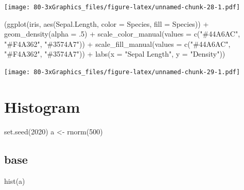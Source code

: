 \documentclass[
]{book}
\newenvironment{Shaded}{\begin{snugshade}}{\end{snugshade}}
\newcommand{\AttributeTok}[1]{\textcolor[rgb]{0.77,0.63,0.00}{#1}}
\newcommand{\DecValTok}[1]{\textcolor[rgb]{0.00,0.00,0.81}{#1}}
\newcommand{\FunctionTok}[1]{\textcolor[rgb]{0.00,0.00,0.00}{#1}}
\newcommand{\NormalTok}[1]{#1}
\newcommand{\OtherTok}[1]{\textcolor[rgb]{0.56,0.35,0.01}{#1}}
\newcommand{\SpecialCharTok}[1]{\textcolor[rgb]{0.00,0.00,0.00}{#1}}
\newcommand{\StringTok}[1]{\textcolor[rgb]{0.31,0.60,0.02}{#1}}
\begin{document}
\texttt{[image: 80-3xGraphics\_files/figure-latex/unnamed-chunk-28-1.pdf]}

\begin{Shaded}
\begin{Highlighting}[]
\NormalTok{(}\FunctionTok{ggplot}\NormalTok{(iris, }\FunctionTok{aes}\NormalTok{(Sepal.Length, }\AttributeTok{color =}\NormalTok{ Species, }\AttributeTok{fill =}\NormalTok{ Species)) }\SpecialCharTok{+} 
  \FunctionTok{geom\_density}\NormalTok{(}\AttributeTok{alpha =}\NormalTok{ .}\DecValTok{5}\NormalTok{) }\SpecialCharTok{+}
  \FunctionTok{scale\_color\_manual}\NormalTok{(}\AttributeTok{values =} \FunctionTok{c}\NormalTok{(}\StringTok{"\#44A6AC"}\NormalTok{, }\StringTok{"\#F4A362"}\NormalTok{, }\StringTok{"\#3574A7"}\NormalTok{)) }\SpecialCharTok{+}
  \FunctionTok{scale\_fill\_manual}\NormalTok{(}\AttributeTok{values =} \FunctionTok{c}\NormalTok{(}\StringTok{"\#44A6AC"}\NormalTok{, }\StringTok{"\#F4A362"}\NormalTok{, }\StringTok{"\#3574A7"}\NormalTok{)) }\SpecialCharTok{+}
  \FunctionTok{labs}\NormalTok{(}\AttributeTok{x =} \StringTok{"Sepal Length"}\NormalTok{, }\AttributeTok{y =} \StringTok{"Density"}\NormalTok{))}
\end{Highlighting}
\end{Shaded}

\texttt{[image: 80-3xGraphics\_files/figure-latex/unnamed-chunk-29-1.pdf]}

\hypertarget{histogram-1}{%
\section{Histogram}\label{histogram-1}}

\begin{Shaded}
\begin{Highlighting}[]
\FunctionTok{set.seed}\NormalTok{(}\DecValTok{2020}\NormalTok{)}
\NormalTok{a }\OtherTok{\textless{}{-}} \FunctionTok{rnorm}\NormalTok{(}\DecValTok{500}\NormalTok{)}
\end{Highlighting}
\end{Shaded}

\hypertarget{base-4}{%
\subsection{base}\label{base-4}}

\begin{Shaded}
\begin{Highlighting}[]
\FunctionTok{hist}\NormalTok{(a)}
\end{Highlighting}
\end{Shaded}
\end{document}
